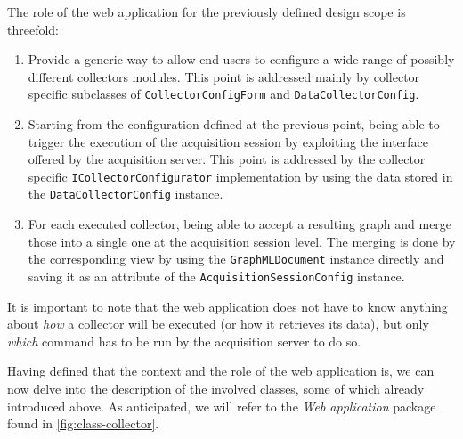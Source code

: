 The role of the web application for the previously defined design scope is threefold:
\begin{enumerate}
  \item Provide a generic way to allow end users to configure a wide range of possibly different collectors modules. This point is addressed mainly by collector specific subclasses of \texttt{CollectorConfigForm} and \texttt{DataCollectorConfig}.
  \item Starting from the configuration defined at the previous point, being able to trigger the execution of the acquisition session by exploiting the interface offered by the acquisition server. This point is addressed by the collector specific \texttt{ICollectorConfigurator} implementation by using the data stored in the \texttt{DataCollectorConfig} instance.
  \item For each executed collector, being able to accept a resulting graph and merge those into a single one at the acquisition session level. The merging is done by the corresponding view by using the \texttt{GraphMLDocument} instance directly and saving it as an attribute of the \texttt{AcquisitionSessionConfig} instance.
\end{enumerate}
It is important to note that the web application does not have to know anything about \emph{how} a collector will be executed (or how it retrieves its data), but only \emph{which} command has to be run by the acquisition server to do so.

Having defined that the context and the role of the web application is, we can now delve into the description of the involved classes, some of which already introduced above. As anticipated, we will refer to the \emph{Web application} package found in \vref{fig:class-collector}.


